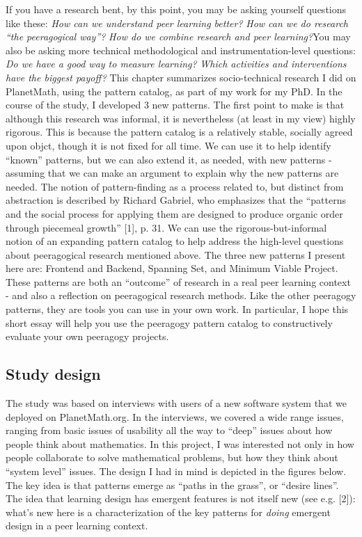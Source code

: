 If you have a research bent, by this point, you may be asking yourself
questions like these: \emph{How can we understand peer learning better?}
\emph{How can we do research ``the peeragogical way''?} \emph{How do we
combine research and peer learning?}You may also be asking more
technical methodological and instrumentation-level questions: \emph{Do
we have a good way to measure learning?} \emph{Which activities and
interventions have the biggest payoff?} This chapter summarizes
socio-technical research I did on PlanetMath, using the pattern catalog,
as part of my work for my PhD. In the course of the study, I developed 3
new patterns. The first point to make is that although this research was
informal, it is nevertheless (at least in my view) highly rigorous. This
is because the pattern catalog is a relatively stable, socially agreed
upon objct, though it is not fixed for all time. We can use it to help
identify ``known'' patterns, but we can also extend it, as needed, with
new patterns - assuming that we can make an argument to explain why the
new patterns are needed. The notion of pattern-finding as a process
related to, but distinct from abstraction is described by Richard
Gabriel, who emphasizes that the ``patterns and the social process for
applying them are designed to produce organic order through piecemeal
growth'' {[}1{]}, p. 31. We can use the rigorous-but-informal notion of
an expanding pattern catalog to help address the high-level questions
about peeragogical research mentioned above. The three new patterns I
present here are: Frontend and Backend, Spanning Set, and Minimum Viable
Project. These patterns are both an ``outcome'' of research in a real
peer learning context - and also a reflection on peeragogical research
methods. Like the other peeragogy patterns, they are tools you can use
in your own work. In particular, I hope this short essay will help you
use the peeragogy pattern catalog to constructively evaluate your own
peeragogy projects.

\subsection{Study design}

The study was based on interviews with users of a new software system
that we deployed on PlanetMath.org. In the interviews, we covered a wide
range issues, ranging from basic issues of usability all the way to
``deep'' issues about how people think about mathematics. In this
project, I was interested not only in how people collaborate to solve
mathematical problems, but how they think about ``system level'' issues.
The design I had in mind is depicted in the figures below. The key idea
is that patterns emerge as ``paths in the grass'', or ``desire lines''.
The idea that learning design has emergent features is not itself new
(see e.g. {[}2{]}): what's new here is a characterization of the key
patterns for \emph{doing} emergent design in a peer learning context.

